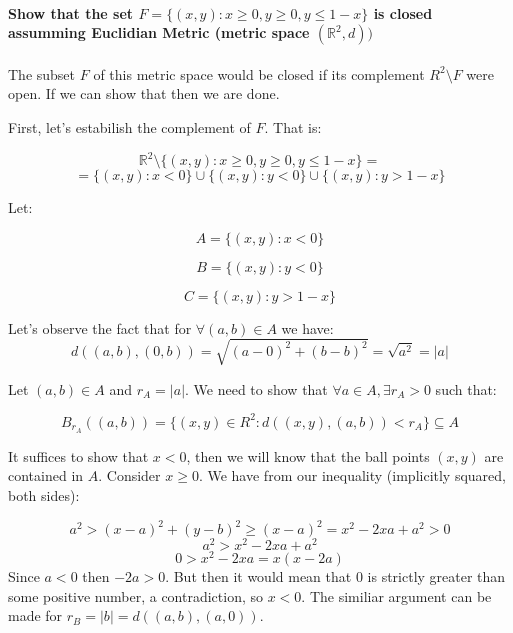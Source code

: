 \documentclass{article}
\begin{document}
\paragraph{Show that the set $F =\{(x,y): x \geq 0, y \geq 0, y \leq 1 - x\}$
is closed assumming Euclidian Metric (metric space $(\mathbb{R}^2, d))$}
\paragraph{}

The subset $F$ of this metric space would be
closed if its complement $R^2 \setminus F$ were open. If we can show that then we are done.

First, let's estabilish the complement of $F$. That is:


\begin{equation*}
	\mathbb{R}^2 \setminus \{(x,y):x\geq0,y\geq0, y\leq1-x\} =	
\end{equation*}
\begin{equation*}
	= \{(x,y):x<0\} \cup \{(x,y):y<0\} \cup \{(x,y):y > 1-x\}
\end{equation*}

Let:

\begin{equation*}
	A =   \{(x,y):x<0\}
\end{equation*}

\begin{equation*}
	B = \{(x,y):y<0\}
\end{equation*}

\begin{equation*}
	C =  \{(x,y):y > 1-x\}
\end{equation*}


Let's observe the fact that for $\forall (a,b) \in A$ we have:
\begin{equation*}
	d((a, b),(0, b)) = \sqrt{(a - 0)^2 + (b - b)^2} = \sqrt{a^2} = |a|
\end{equation*}

Let $(a,b) \in A$ and $r_{A} = |a|$. We need to show that $\forall a \in A,
\exists r_{A}>0$ such that:

\begin{equation*}	
	B_{r_{A}}((a,b))=\{(x,y) \in R^2: d((x,y), (a,b)) < r_{A}\} \subseteq A
\end{equation*}

It suffices to show that $x < 0$, then we will know that the ball points $(x,y)$ are
contained in $A$. Consider $x \geq 0$.  We have from our inequality (implicitly
squared, both sides):

\begin{equation*}
	a^2 > (x-a)^2 + (y-b)^2 \geq (x-a)^2 = x^2 - 2xa + a^2 > 0
\end{equation*}
\begin{equation*}
	a^2 > x^2 -2xa + a^2 
\end{equation*}
\begin{equation*}
	0 > x^2 -2xa = x(x - 2a)
\end{equation*}
Since $a < 0$ then $-2a > 0$. But then it would mean that $0$ is strictly
greater than some positive number, a contradiction, so $x < 0$. The similiar
argument can be made for $r_{B} = |b| = d((a, b),(a, 0))$.
\end{document}
